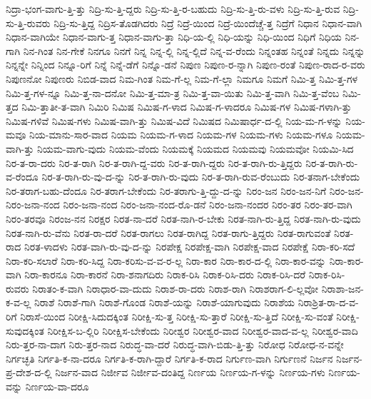 {ನಿದ್ರಾ-ಭಂಗ-ವಾಗು-ತ್ತಿ-ತ್ತು
ನಿದ್ರಿ-ಸು-ತ್ತಿ-ದ್ದರು
ನಿದ್ರಿ-ಸು-ತ್ತಿ-ರ-ಬಹುದು
ನಿದ್ರಿ-ಸು-ತ್ತಿ-ರು-ವಳು
ನಿದ್ರಿ-ಸು-ತ್ತಿ-ರುವ
ನಿದ್ರಿ-ಸು-ತ್ತಿ-ರುವರು
ನಿದ್ರಿ-ಸು-ತ್ತಿದ್ದ
ನಿದ್ರಿಸ-ತೊಡಗಿದರು
ನಿದ್ರೆ
ನಿದ್ರೆ-ಯಿಂದ
ನಿದ್ರೆ-ಯಿಂದೆಚ್ಚೆ-ತ್ತ
ನಿದ್ರೆಗೆ
ನಿಧಾನ
ನಿಧಾನ-ವಾಗಿ
ನಿಧಾನ-ವಾಗಿಯೇ
ನಿಧಾನ-ವಾಗು-ತ್ತ
ನಿಧಾನ-ವಾಗು-ತ್ತಾ
ನಿಧಿ-ಯ-ಲ್ಲಿ
ನಿಧಿ-ಯನ್ನು
ನಿಧಿ-ಯಿಂದ
ನಿಧಿಗೆ
ನಿಧಿಯ
ನಿನ-ಗಾಗಿ
ನಿನ-ಗಿಂತ
ನಿನ-ಗೇಕೆ
ನಿನಗೂ
ನಿನಗೆ
ನಿನ್ನ
ನಿನ್ನ-ಲ್ಲಿ
ನಿನ್ನ-ಲ್ಲಿದೆ
ನಿನ್ನ-ವ-ರೆಂದು
ನಿನ್ನಂತಹ
ನಿನ್ನಂತೆ
ನಿನ್ನದು
ನಿನ್ನನ್ನು
ನಿನ್ನನ್ನೇ
ನಿನ್ನಿಂದ
ನಿನ್ನೂ-ರಿಗೆ
ನಿನ್ನೆ
ನಿನ್ನೆ-ಡೆಗೆ
ನಿನ್ನೊ-ಡನೆ
ನಿಪುಣ
ನಿಪುಣ-ರ-ನ್ನಾಗಿ
ನಿಪುಣ-ರಂತೆ
ನಿಪುಣ-ರಾದ-ರ-ವರು
ನಿಪುಣನೋ
ನಿಪುಣರು
ನಿಬಿಡ-ವಾದ
ನಿಮ-ಗಿಂತ
ನಿಮ-ಗೆ-ಲ್ಲ
ನಿಮ-ಗೆ-ಲ್ಲಾ
ನಿಮಗೂ
ನಿಮಗೆ
ನಿಮಿ-ತ್ತ
ನಿಮಿ-ತ್ತ-ಗಳ
ನಿಮಿ-ತ್ತ-ಗಳ-ನ್ನೂ
ನಿಮಿ-ತ್ತ-ನಾ-ದನೋ
ನಿಮಿ-ತ್ತ-ಮಾ-ತ್ರ
ನಿಮಿ-ತ್ತ-ವಾ-ಯಿತು
ನಿಮಿ-ತ್ತ-ವಾಗಿ
ನಿಮಿ-ತ್ತ-ವೆಂಬ
ನಿಮಿ-ತ್ತದ
ನಿಮಿ-ತ್ತಾತೀ-ತ-ವಾಗಿ
ನಿಮಿರಿ
ನಿಮಿಷ
ನಿಮಿಷ-ಗ-ಳಾದ
ನಿಮಿಷ-ಗ-ಳಾದರೂ
ನಿಮಿಷ-ಗಳ
ನಿಮಿಷ-ಗಳಾಗಿ-ತ್ತು
ನಿಮಿಷ-ಗಳಿವೆ
ನಿಮಿಷ-ಗಳು
ನಿಮಿಷ-ವಾಗಿ-ತ್ತು
ನಿಮಿಷ-ವಿದೆ
ನಿಮಿಷದ
ನಿಮಿಷಾರ್ಧ-ದ-ಲ್ಲಿ
ನಿಯ-ಮ-ಗ-ಳನ್ನು
ನಿಯ-ಮವೂ
ನಿಯ-ಮಾನು-ಸಾರ-ವಾದ
ನಿಯಮ
ನಿಯಮ-ಗ-ಳಾದ
ನಿಯಮ-ಗಳ
ನಿಯಮ-ಗಳು
ನಿಯಮ-ಗಳೂ
ನಿಯಮ-ವಾಗಿ-ತ್ತು
ನಿಯಮ-ವಾಗು-ವುದು
ನಿಯಮ-ವೆಂದು
ನಿಯಮಕ್ಕೆ
ನಿಯಮದ
ನಿಯಮವು
ನಿಯಮವೋ
ನಿಯಮಿ-ಸಿದ
ನಿರ-ತ-ರಾ-ದರು
ನಿರ-ತ-ರಾಗಿ
ನಿರ-ತ-ರಾಗಿ-ದ್ದ-ವರು
ನಿರ-ತ-ರಾಗಿ-ದ್ದರು
ನಿರ-ತ-ರಾಗಿ-ರು-ತ್ತಿದ್ದರು
ನಿರ-ತ-ರಾಗಿ-ರು-ವ-ರೆಂದೂ
ನಿರ-ತ-ರಾಗಿ-ರು-ವು-ದ-ನ್ನು
ನಿರ-ತ-ರಾಗಿ-ರು-ವುದು
ನಿರ-ತ-ರಾಗಿ-ರುವ-ರೆಂಬುದು
ನಿರ-ತನಾಗ-ಬೇಕೆಂದು
ನಿರ-ತರಾಗ-ಬಹು-ದೆಂದೂ
ನಿರ-ತರಾಗ-ಬೇಕೆಂದು
ನಿರ-ತರಾಗು-ತ್ತಿ-ದ್ದು-ದ-ನ್ನು
ನಿರಂ-ಜನ
ನಿರಂ-ಜನ-ನಿಗೆ
ನಿರಂ-ಜನ-ನಿರಂ-ಜನಾ-ನಂದ
ನಿರಂ-ಜನಾ-ನಂದ
ನಿರಂ-ಜನಾ-ನಂದ-ರೊ-ಡನೆ
ನಿರಂ-ಜನಾ-ನಂದರ
ನಿರಂ-ತರ
ನಿರಂ-ತರ-ವಾಗಿ
ನಿರಂ-ತರವೂ
ನಿರಂಜ-ನನ
ನಿರಕ್ಷರ
ನಿರತ-ನಾ-ದರೆ
ನಿರತ-ನಾಗಿ-ರ-ಬೇಕು
ನಿರತ-ನಾಗಿ-ರು-ತ್ತಿದ್ದ
ನಿರತ-ನಾಗಿ-ರು-ವುದು
ನಿರತ-ನಾಗಿ-ರು-ವೆನು
ನಿರತ-ರಾ-ದರೆ
ನಿರತ-ರಾಗಲು
ನಿರತ-ರಾಗಿದ್ದ
ನಿರತ-ರಾಗು-ತ್ತಿದ್ದರು
ನಿರತ-ರಾಗುವಂತೆ
ನಿರತ-ರಾದ
ನಿರತ-ಳಾದಳು
ನಿರತ-ವಾಗಿ-ರು-ವು-ದ-ನ್ನು
ನಿರಪೇಕ್ಷ
ನಿರಪೇಕ್ಷ-ವಾಗಿ
ನಿರಪೇಕ್ಷ-ವಾದ
ನಿರಪೇಕ್ಷೆ
ನಿರಾ-ಕರಿ-ಸದೆ
ನಿರಾ-ಕರಿ-ಸಲಾರೆ
ನಿರಾ-ಕರಿ-ಸಿದ್ದ
ನಿರಾ-ಕರಿಸು-ವ-ವ-ರ-ಲ್ಲ
ನಿರಾ-ಕಾರ
ನಿರಾ-ಕಾರ-ದ-ಲ್ಲಿ
ನಿರಾ-ಕಾರ-ವನ್ನು
ನಿರಾ-ಕಾರ-ವಾಗಿ
ನಿರಾ-ಕಾರನೂ
ನಿರಾ-ಕಾರನೆ
ನಿರಾ-ಶನಾಗದಿರು
ನಿರಾಕ-ರಿಸಿ
ನಿರಾಕ-ರಿಸಿ-ದರು
ನಿರಾಕ-ರಿಸಿ-ದರೆ
ನಿರಾಕ-ರಿಸಿ-ರುವರು
ನಿರಾತಂ-ಕ-ವಾಗಿ
ನಿರಾಧಾರ-ವಾ-ದುದು
ನಿರಾಶ-ರಾ-ದರು
ನಿರಾಶ-ರಾಗಿ
ನಿರಾಶರಾಗ-ಲಿ-ಲ್ಲವೋ
ನಿರಾಶಾ-ಜನ-ಕ-ವ-ಲ್ಲ
ನಿರಾಶೆ
ನಿರಾಶೆ-ಗಾಗಿ
ನಿರಾಶೆ-ಗೊಂಡ
ನಿರಾಶೆ-ಯನ್ನು
ನಿರಾಶೆ-ಯಾಗುವುದು
ನಿರಾಶೆಯ
ನಿರಾಶ್ರಿತ-ರಾ-ದ-ವ-ರಿಗೆ
ನಿರಾಸೆ-ಯಿಂದ
ನಿರೀಕ್ಷಿ-ಸಿದುದಕ್ಕಿಂತ
ನಿರೀಕ್ಷಿ-ಸು-ತ್ತ
ನಿರೀಕ್ಷಿ-ಸು-ತ್ತಾರೆ
ನಿರೀಕ್ಷಿ-ಸು-ತ್ತಿದೆ
ನಿರೀಕ್ಷಿ-ಸು-ವಂತೆ
ನಿರೀಕ್ಷಿ-ಸುವುದಕ್ಕಿಂತ
ನಿರೀಕ್ಷಿಸ-ಬ-ಲ್ಲಿರಿ
ನಿರೀಕ್ಷಿಸ-ಬೇಕೆಂದು
ನಿರೀಶ್ವರ
ನಿರೀಶ್ವರ-ವಾದ
ನಿರೀಶ್ವರ-ವಾದ-ವ-ಲ್ಲ
ನಿರೀಶ್ವರ-ವಾದಿ
ನಿರು-ತ್ತರ-ನಾ-ದಾಗ
ನಿರು-ತ್ತರ-ನಾದ
ನಿರುದ್ಧ-ವಾ-ದರೆ
ನಿರುದ್ಧ-ವಾಗಿ-ಬಿಡು-ತ್ತಿ-ತ್ತು
ನಿರೋಧ
ನಿರೋಧ-ನ-ವನ್ನೇ
ನಿರ್ಗಚ್ಛತಿ
ನಿರ್ಗತಿ-ಕ-ನಾ-ದರೂ
ನಿರ್ಗತಿ-ಕ-ರಾಗಿ-ದ್ದಾರೆ
ನಿರ್ಗತಿ-ಕ-ರಾದ
ನಿರ್ಗುಣ-ವಾಗಿ
ನಿರ್ಗುಣನೆ
ನಿರ್ಜನ
ನಿರ್ಜನ-ಪ್ರ-ದೇಶ-ದ-ಲ್ಲಿ
ನಿರ್ಜನ-ವಾದ
ನಿರ್ಜೀವ
ನಿರ್ಜೀವ-ದಂತಿದ್ದ
ನಿರ್ಣಯ
ನಿರ್ಣಯ-ಗ-ಳನ್ನು
ನಿರ್ಣಯ-ಗಳು
ನಿರ್ಣಯ-ವನ್ನು
ನಿರ್ಣಯ-ವಾ-ದರೂ
}
